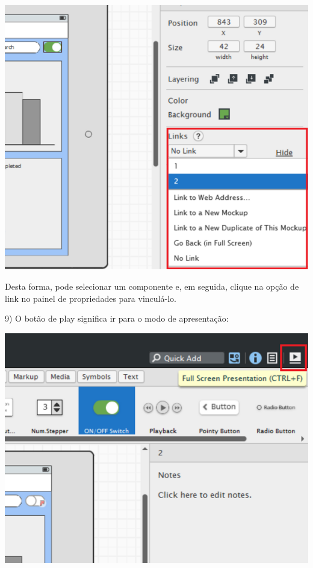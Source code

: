 \documentclass{tufte-book} %
\begin{document}
\begin{center}
	\includegraphics{img19.png}
\end{center}

Desta forma, pode selecionar um componente e, em seguida, clique na opção de link no painel de propriedades para vinculá-lo.

\break

9) O botão de play significa ir para o modo de apresentação:

\begin{center}
	\includegraphics{img20.png}
\end{center}
\end{document}
